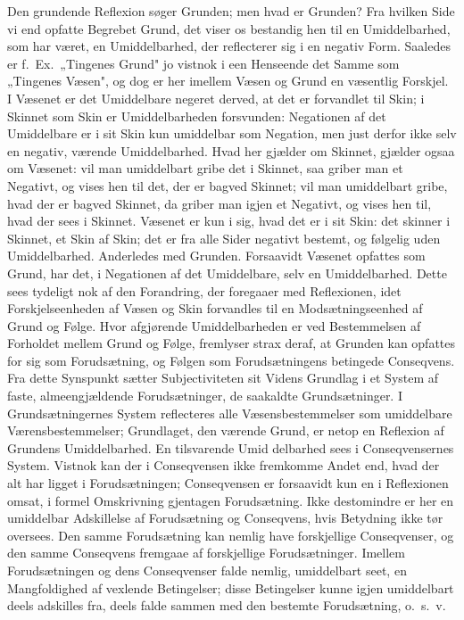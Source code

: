 \documentclass[12pt]{book}
\newcommand{\opage}[1]{\marginnote{\footnotesize\textit{[#1]}}}
\begin{document}
\opage{86} Den grundende Reflexion søger Grunden; men hvad er Grunden? Fra hvilken Side vi end
opfatte Begrebet Grund, det viser os bestandig hen til en Umiddelbarhed, som har
været, en Umiddelbarhed, der reflecterer sig i en negativ Form. Saaledes er f.\ Ex.\
„Tingenes Grund" jo vistnok i een Henseende det Samme som „Tingenes Væsen", og dog er
her imellem Væsen og Grund en væsentlig Forskjel. I Væsenet er det Umiddelbare
negeret derved, at det er forvandlet til Skin; i Skinnet som Skin er Umiddelbarheden
forsvunden: Negationen af det Umiddelbare er i sit Skin kun umiddelbar som Negation,
men just derfor ikke selv en negativ, værende Umiddelbarhed. Hvad her gjælder om
Skinnet, gjælder ogsaa om Væsenet: vil man umiddelbart gribe det i Skinnet, saa
griber man et Negativt, og vises hen til det, der er bagved Skinnet; vil man
umiddelbart gribe, hvad der er bagved Skinnet, da griber man igjen et Negativt, og
vises hen til, hvad der sees i Skinnet. Væsenet er kun i sig, hvad det er i sit Skin:
det skinner i Skinnet, et Skin af Skin; det er fra alle Sider negativt bestemt, og
følgelig uden Umiddelbarhed. Anderledes med Grunden. Forsaavidt Væsenet opfattes som
Grund, har det, i Negationen af det Umiddelbare, selv en Umiddelbarhed. Dette sees
tydeligt nok af den Forandring, der foregaaer med Reflexionen, idet Forskjelseenheden
af Væsen og Skin forvandles til en Modsætningseenhed af Grund og Følge. Hvor
afgjørende Umiddelbarheden er ved Bestemmelsen af Forholdet mellem Grund og Følge,
fremlyser strax deraf, at Grunden kan opfattes for sig som Forudsætning, og Følgen som
Forudsætningens betingede Conseqvens. Fra dette Synspunkt sætter Subjectiviteten sit
Videns Grundlag i et System af faste, almeengjældende Forudsætninger, de saakaldte
Grundsætninger. I Grundsætningernes System reflecteres alle Væsensbestemmelser som
umiddelbare Værensbestemmelser; Grundlaget, den værende Grund, er netop en Reflexion
af Grundens Umiddelbarhed. En tilsvarende Umid%
\opage{87} delbarhed sees i Conseqvensernes System. Vistnok kan der i Conseqvensen ikke
fremkomme Andet end, hvad der alt har ligget i Forudsætningen; Conseqvensen er
forsaavidt kun en i Reflexionen omsat, i formel Omskrivning gjentagen Forudsætning.
Ikke destomindre er her en umiddelbar Adskillelse af Forudsætning og Conseqvens, hvis
Betydning ikke tør oversees. Den samme Forudsætning kan nemlig have forskjellige
Conseqvenser, og den samme Conseqvens fremgaae af forskjellige Forudsætninger.
Imellem Forudsætningen og dens Conseqvenser falde nemlig, umiddelbart seet, en
Mangfoldighed af vexlende Betingelser; disse Betingelser kunne igjen umiddelbart
deels adskilles fra, deels falde sammen med den bestemte Forudsætning, o.\ s.\ v.
\end{document}
